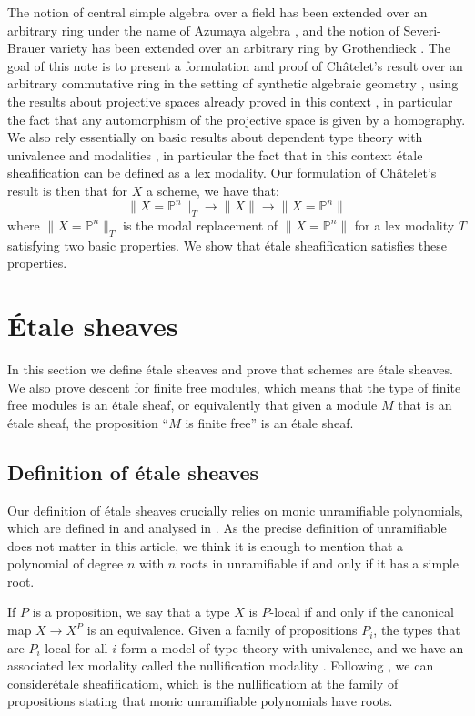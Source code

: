 \documentclass[10pt,a4paper]{article}
\theoremstyle{definition}
\newcommand{\propTrunc}[1]{\lVert #1 \rVert}
\newcommand{\bP}{\mathbb{P}}
\begin{document}
The notion of central simple algebra over a field has been extended over an arbitrary ring under the name of Azumaya algebra \cite{azumaya51}, and the notion of Severi-Brauer variety has been extended over an arbitrary ring by Grothendieck \cite{grothendieck68}.
The goal of this note is to present a formulation and proof of Ch\^atelet's result over an arbitrary commutative ring
in the setting of synthetic algebraic geometry \cite{draft}, using the results about projective
spaces already proved in this context \cite{sag-projective}, in particular the fact that any automorphism of the projective space is given by a homography. We also rely essentially on basic results about dependent type theory with univalence \cite{hott}
and modalities \cite{modalities}, in particular the fact that in this context \'etale sheafification can be defined
as a lex modality. Our formulation of Ch\^atelet's result is then that for $X$ a scheme, we have that:
\[\propTrunc{X=\bP^n}_{T} \to \propTrunc{X} \to \propTrunc{X=\bP^n}\]
where $\propTrunc{X=\bP^n}_{T}$ is the modal replacement of $\propTrunc{X=\bP^n}$ for a lex modality $T$ satisfying two basic properties. We show that \'etale sheafification satisfies these properties.



\section{\'Etale sheaves}
\label{etale-sheaves}

In this section we define étale sheaves and prove that schemes are étale sheaves. We also prove descent for finite free modules, which means that the type of finite free modules is an étale sheaf, or equivalently that given a module $M$ that is an étale sheaf, the proposition ``$M$ is finite free'' is an étale sheaf.


\subsection{Definition of étale sheaves}

Our definition of étale sheaves crucially relies on monic unramifiable polynomials, which are defined in \cite{wraith79} and analysed in \cite{coqazumaya}. As the precise definition of unramifiable does not matter in this article, we think it is enough to mention that a polynomial of degree $n$ with $n$ roots in unramifiable if and only if it has a simple root.

If $P$ is a proposition, we say that a type $X$ is $P$-local if and only if the canonical map $X\rightarrow X^P$ is an equivalence.
Given a family of propositions $P_i$, the types that are $P_i$-local for all $i$ form a model of type theory with univalence,
and we have an associated lex modality called the nullification modality \cite{modalities,Quirin16}.
Following \cite{wraith79}, we can consider\'etale sheafificatiom, which is the nullificatiom at the family of propositions stating that monic unramifiable polynomials have roots.
\end{document}
